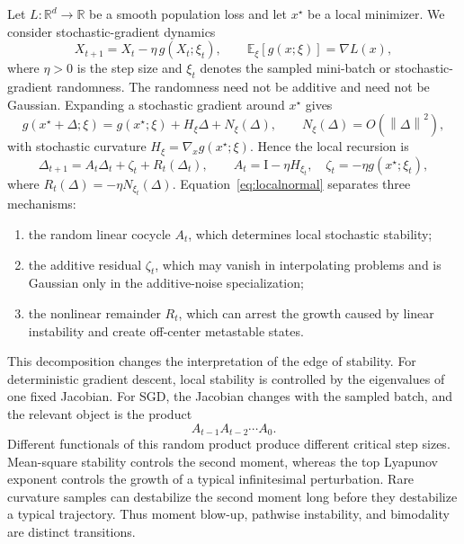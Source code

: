 \documentclass[11pt]{article}
\newcommand{\E}{\mathbb{E}}
\newcommand{\R}{\mathbb{R}}
\newcommand{\Id}{\mathrm{I}}
\newcommand{\norm}[1]{\left\lVert #1\right\rVert}
\begin{document}
Let $L:\R^d\to\R$ be a smooth population loss and let $x^\star$ be a local minimizer.  We consider stochastic-gradient dynamics
\begin{equation}
    X_{t+1}=X_t-\eta\,g(X_t;\xi_t),
    \qquad \E_{\xi}[g(x;\xi)]=\nabla L(x),
    \label{eq:sgd}
\end{equation}
where $\eta>0$ is the step size and $\xi_t$ denotes the sampled mini-batch or stochastic-gradient randomness.  The randomness need not be additive and need not be Gaussian.  Expanding a stochastic gradient around $x^\star$ gives
\begin{equation}
 g(x^\star+\Delta;\xi)
 =g(x^\star;\xi)+H_{\xi}\Delta+N_{\xi}(\Delta),
 \qquad N_{\xi}(\Delta)=O(\norm{\Delta}^2),
 \label{eq:localgrad}
\end{equation}
with stochastic curvature $H_{\xi}=\nabla_xg(x^\star;\xi)$.  Hence the local recursion is
\begin{equation}
 \Delta_{t+1}
 =A_t\Delta_t+\zeta_t+R_t(\Delta_t),
 \qquad
 A_t=\Id-\eta H_{\xi_t},
 \quad
 \zeta_t=-\eta g(x^\star;\xi_t),
 \label{eq:localnormal}
\end{equation}
where $R_t(\Delta)=-\eta N_{\xi_t}(\Delta)$.  Equation~\eqref{eq:localnormal} separates three mechanisms:
\begin{enumerate}[leftmargin=1.6em,itemsep=0.15em]
    \item the random linear cocycle $A_t$, which determines local stochastic stability;
    \item the additive residual $\zeta_t$, which may vanish in interpolating problems and is Gaussian only in the additive-noise specialization;
    \item the nonlinear remainder $R_t$, which can arrest the growth caused by linear instability and create off-center metastable states.
\end{enumerate}

This decomposition changes the interpretation of the edge of stability.  For deterministic gradient descent, local stability is controlled by the eigenvalues of one fixed Jacobian.  For SGD, the Jacobian changes with the sampled batch, and the relevant object is the product
\begin{equation}
 A_{t-1}A_{t-2}\cdots A_0.
\end{equation}
Different functionals of this random product produce different critical step sizes.  Mean-square stability controls the second moment, whereas the top Lyapunov exponent controls the growth of a typical infinitesimal perturbation.  Rare curvature samples can destabilize the second moment long before they destabilize a typical trajectory.  Thus moment blow-up, pathwise instability, and bimodality are distinct transitions.
\end{document}
